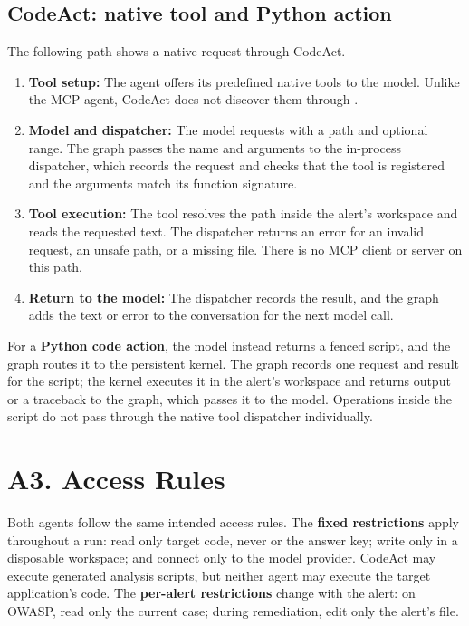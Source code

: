 \documentclass[11pt,letterpaper]{article}
\newcommand{\code}[1]{\texttt{\detokenize{#1}}}
\begin{document}
\subsection*{CodeAct: native tool and Python action}

The following path shows a native \code{read_file} request through CodeAct.
\begin{enumerate}[leftmargin=*,itemsep=0.25em]
\item \textbf{Tool setup:} The agent offers its predefined native tools to the model. Unlike the MCP agent, CodeAct does not discover them through \code{tools/list}.
\item \textbf{Model and dispatcher:} The model requests \code{read_file} with a path and optional range. The graph passes the name and arguments to the in-process dispatcher, which records the request and checks that the tool is registered and the arguments match its function signature.
\item \textbf{Tool execution:} The tool resolves the path inside the alert's workspace and reads the requested text. The dispatcher returns an error for an invalid request, an unsafe path, or a missing file. There is no MCP client or server on this path.
\item \textbf{Return to the model:} The dispatcher records the result, and the graph adds the text or error to the conversation for the next model call.
\end{enumerate}

For a \textbf{Python code action}, the model instead returns a fenced script, and the graph routes it to the persistent kernel. The graph records one request and result for the script; the kernel executes it in the alert's workspace and returns output or a traceback to the graph, which passes it to the model. Operations inside the script do not pass through the native tool dispatcher individually.

\section*{A3. Access Rules}

Both agents follow the same intended access rules. The \textbf{fixed restrictions} apply throughout a run: read only target code, never \code{.git} or the answer key; write only in a disposable workspace; and connect only to the model provider. CodeAct may execute generated analysis scripts, but neither agent may execute the target application's code. The \textbf{per-alert restrictions} change with the alert: on OWASP, read only the current case; during remediation, edit only the alert's file.
\end{document}
